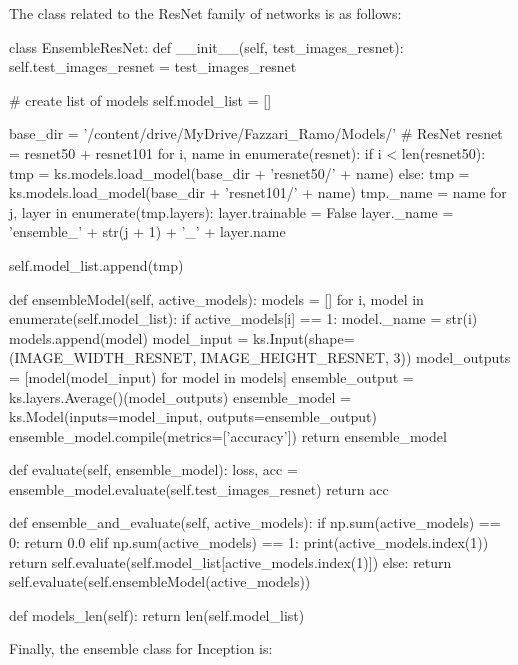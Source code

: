 The class related to the ResNet family of networks is as follows:

\begin{python}
class EnsembleResNet:
    def __init__(self, test_images_resnet):
        self.test_images_resnet = test_images_resnet

        # create list of models
        self.model_list = []

        base_dir = '/content/drive/MyDrive/Fazzari_Ramo/Models/'
        # ResNet
        resnet = resnet50 + resnet101
        for i, name in enumerate(resnet):
            if i < len(resnet50):
                tmp = ks.models.load_model(base_dir + 'resnet50/' + name)
            else:
                tmp = ks.models.load_model(base_dir + 'resnet101/' + name)
            tmp._name = name
            for j, layer in enumerate(tmp.layers):
                layer.trainable = False
                layer._name = 'ensemble_' + str(j + 1) + '_' + layer.name

            self.model_list.append(tmp)



    def ensembleModel(self, active_models):
        models = []
        for i, model in enumerate(self.model_list):
            if active_models[i] == 1:
                model._name = str(i)
                models.append(model)
        model_input = ks.Input(shape=(IMAGE_WIDTH_RESNET, IMAGE_HEIGHT_RESNET, 3))
        model_outputs = [model(model_input) for model in models]
        ensemble_output = ks.layers.Average()(model_outputs)
        ensemble_model = ks.Model(inputs=model_input, outputs=ensemble_output)
        ensemble_model.compile(metrics=['accuracy'])
        return ensemble_model

    def evaluate(self, ensemble_model):
        loss, acc = ensemble_model.evaluate(self.test_images_resnet)
        return acc

    def ensemble_and_evaluate(self, active_models):
        if np.sum(active_models) == 0:
            return 0.0
        elif np.sum(active_models) == 1:
            print(active_models.index(1))
            return self.evaluate(self.model_list[active_models.index(1)])
        else:
            return self.evaluate(self.ensembleModel(active_models))

    def models_len(self):
        return len(self.model_list)
\end{python}

Finally, the ensemble class for Inception is:

